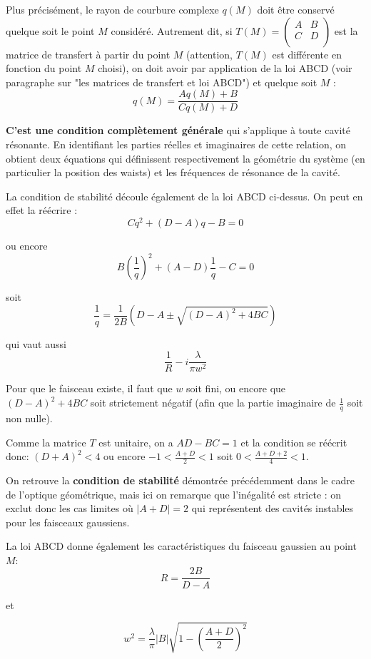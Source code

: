 \documentclass{book}
\begin{document}
Plus précisément, le rayon de courbure complexe \(q(M)\) doit être conservé quelque soit le point \(M\) considéré. Autrement dit, si \(T(M)= \begin{pmatrix}
A & B \\
C & D \\
\end{pmatrix}\) est la matrice de transfert à partir du point \(M\) (attention, \(T(M)\) est
différente en fonction du
point \(M\) choisi), on doit avoir par application de la loi ABCD (voir paragraphe sur "les matrices de transfert et loi ABCD") et quelque soit \(M\) :
\[q(M) = \frac {Aq(M)+B}{Cq(M) + D}\]

\textbf{\color{red}C'est une condition complètement générale} qui s'applique à toute cavité
résonante. En identifiant les parties réelles et imaginaires de cette relation, on obtient deux équations qui définissent respectivement la géométrie du système (en particulier la position des waists) et les fréquences de résonance de la cavité.

La condition de stabilité découle également de la loi ABCD ci-dessus. On peut en effet la réécrire :
\[Cq^2+(D-A)q-B = 0\]

ou encore
\[B \left(\frac 1 q \right)^2 + (A-D) \frac 1 q -C=0\]

soit
\[\frac 1q=\frac1{2B}\left(D-A\pm\sqrt{(D-A)^2+4BC}\right)\]

qui vaut aussi
\[\frac 1R-i\frac\lambda{\pi w^2}\]

Pour que le faisceau existe, il faut que \(w\) soit fini, ou encore que \((D-A)^2+4BC\) soit strictement négatif (afin que la partie imaginaire de \(\frac 1q\) soit non nulle).

Comme la matrice $T$ est unitaire, on a $AD-BC = 1$ et la condition se réécrit donc: $(D+A)^2 < 4$ ou encore $-1 < \frac{A+D}2 < 1$ soit $0 < \frac{A+D+2}4 < 1$.

On retrouve la \textbf{\color{red}condition de stabilité} démontrée précédemment dans le cadre de l'optique géométrique, mais ici on remarque que l'inégalité est stricte : on exclut donc les cas limites où \(\lvert A+D\rvert =2\) qui représentent des cavités instables pour les faisceaux gaussiens.

La loi ABCD donne également les caractéristiques du faisceau gaussien au point \(M\):
\[R = \frac{2B}{D-A}\]

et

\[w^2 = \frac \lambda \pi \lvert B\rvert \sqrt{1-\left( \frac{A+D}2\right)^2}\]
\end{document}
